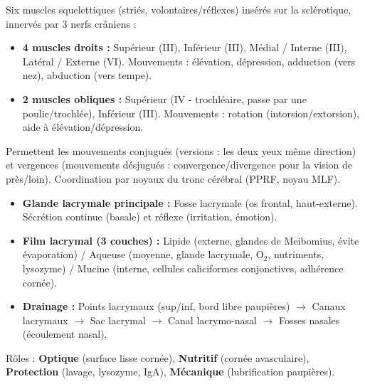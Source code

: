 \documentclass[11pt]{article}
\newcommand{\cle}[1]{{\popxbold\color{popdark}#1}}
\begin{document}
\begin{propriete}
Six muscles squelettiques (striés, volontaires/réflexes) insérés sur la sclérotique, innervés par 3 nerfs crâniens :
\begin{itemize}
\item \textbf{4 muscles droits :} Supérieur (III), Inférieur (III), Médial / Interne (III), Latéral / Externe (VI). Mouvements : élévation, dépression, adduction (vers nez), abduction (vers tempe).
\item \textbf{2 muscles obliques :} Supérieur (IV - trochléaire, passe par une poulie/trochlée), Inférieur (III). Mouvements : rotation (intorsion/extorsion), aide à élévation/dépression.
\end{itemize}
Permettent les \cle{mouvements conjugués} (versions : les deux yeux même direction) et \cle{vergences} (mouvements désjugués : convergence/divergence pour la vision de près/loin). Coordination par noyaux du tronc cérébral (PPRF, noyau MLF).
\end{propriete}

\begin{propriete}
\begin{itemize}
\item \textbf{Glande lacrymale principale :} Fosse lacrymale (os frontal, haut-externe). Sécrétion continue (basale) et réflexe (irritation, émotion).
\item \textbf{Film lacrymal (3 couches) :} Lipide (externe, glandes de Meibomius, évite évaporation) / Aqueuse (moyenne, glande lacrymale, O$_2$, nutriments, lysozyme) / Mucine (interne, cellules caliciformes conjonctives, adhérence cornée).
\item \textbf{Drainage :} Points lacrymaux (sup/inf, bord libre paupières) $\to$ Canaux lacrymaux $\to$ Sac lacrymal $\to$ Canal lacrymo-nasal $\to$ Fosses nasales (écoulement nasal).
\end{itemize}
Rôles : \textbf{Optique} (surface lisse cornée), \textbf{Nutritif} (cornée avasculaire), \textbf{Protection} (lavage, lysozyme, IgA), \textbf{Mécanique} (lubrification paupières).
\end{propriete}
\end{document}
